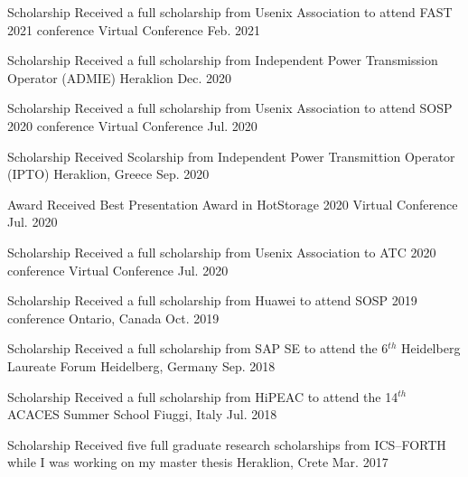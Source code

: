 \begin{cvhonors}
	\cvhonor
	{Scholarship} %
	{Received a full scholarship from Usenix Association to attend
		FAST 2021 conference
	} %
	{Virtual Conference} %
	{Feb. 2021} %

	\cvhonor
	{Scholarship} %
	{Received a full scholarship from Independent Power Transmission
		Operator (ADMIE)} %
	{Heraklion} %
	{Dec. 2020} %

	\cvhonor
	{Scholarship} %
	{Received a full scholarship from Usenix Association to attend
		SOSP 2020 conference} %
	{Virtual Conference} %
	{Jul. 2020} %

	\cvhonor
	{Scholarship} %
	{Received Scolarship from Independent Power Transmittion Operator
		(IPTO)} %
	{Heraklion, Greece} %
	{Sep. 2020} %

	\cvhonor
	{Award} %
	{Received Best Presentation Award in HotStorage 2020} %
	{Virtual Conference} %
	{Jul. 2020} %

	\cvhonor
	{Scholarship} %
	{Received a full scholarship from Usenix Association to ATC 2020
		conference} %
	{Virtual Conference} %
	{Jul. 2020} %

	\cvhonor
	{Scholarship} %
	{Received a full scholarship from Huawei to attend SOSP 2019
		conference} %
	{Ontario, Canada} %
	{Oct. 2019} %

	\cvhonor
	{Scholarship} %
	{Received a full scholarship from SAP SE to attend the 6$^{th}$
		Heidelberg Laureate Forum} %
	{Heidelberg, Germany} %
	{Sep. 2018} %

	\cvhonor
	{Scholarship} %
	{Received a full scholarship from HiPEAC to attend the 14$^{th}$
		ACACES Summer School} %
	{Fiuggi, Italy} %
	{Jul. 2018} %

	\cvhonor
	{Scholarship} %
	{Received five full graduate research scholarships from ICS--FORTH
		while I was working on my master thesis} %
	{Heraklion, Crete} %
	{Mar. 2017} %


\end{cvhonors}
